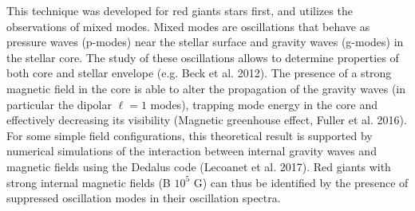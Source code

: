 This technique was developed for red giants stars first, and utilizes the observations of mixed modes. Mixed modes are
oscillations that behave as pressure waves (p-modes) near the stellar surface and gravity waves (g-modes) in the stellar core.
The study of these oscillations allows to determine properties of both core and stellar envelope (e.g. Beck et al. 2012).
The presence of a strong magnetic field in the core is able to alter the propagation of the gravity waves (in particular the dipolar $\ell =1$ modes),
trapping mode energy in the core and effectively decreasing its visibility (Magnetic greenhouse effect, Fuller et al. 2016).
For some simple field configurations, this theoretical result is supported  by numerical simulations of the interaction between
internal gravity waves and magnetic fields using the Dedalus code (Lecoanet et al. 2017).
Red giants with strong internal magnetic fields (B $ 10^5$ G) can thus be identified by the presence of suppressed oscillation modes in their oscillation spectra.
